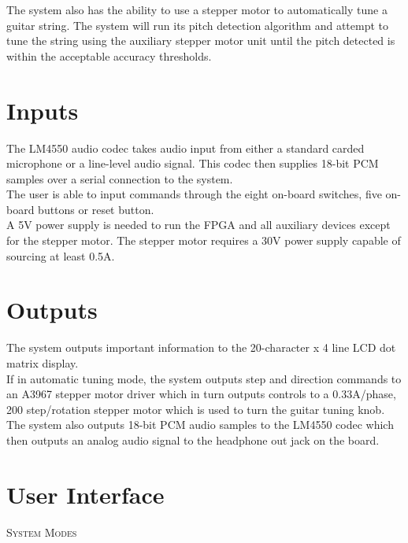 \documentclass[aps,letterpaper,10pt]{revtex4}
\begin{document}
The system also has the ability to use a stepper motor to automatically tune a guitar string. The system will run its pitch detection algorithm and attempt to tune the string using the auxiliary stepper motor unit until the pitch detected is within the acceptable accuracy thresholds. 

\section{Inputs}

The LM4550 audio codec takes audio input from either a standard carded microphone or a line-level audio signal. This codec then supplies 18-bit PCM samples over a serial connection to the system. \\

The user is able to input commands through the eight on-board switches, five on-board buttons or reset button. \\

A 5V power supply is needed to run the FPGA and all auxiliary devices except for the stepper motor. The stepper motor requires a 30V power supply capable of sourcing at least 0.5A. 

\section{Outputs}

The system outputs important information to the 20-character x 4 line LCD dot matrix display.\\

If in automatic tuning mode, the system outputs step and direction commands to an A3967 stepper motor driver which in turn outputs controls to a 0.33A/phase, 200 step/rotation stepper motor which is used to turn the guitar tuning knob. \\

The system also outputs 18-bit PCM audio samples to the LM4550 codec which then outputs an analog audio signal to the headphone out jack on the board. 

\section{User Interface}

\textsc{System Modes} \\
\end{document}
